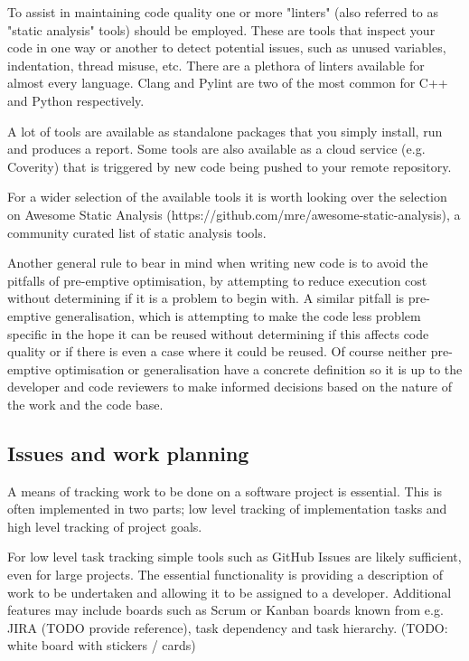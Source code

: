 \documentclass[jnr]{iosart2x}
\begin{document}
To assist in maintaining code quality one or more "linters" (also referred to as "static analysis" tools) should be employed.
These are tools that inspect your code in one way or another to detect potential issues, such as unused variables, indentation, thread misuse, etc.
There are a plethora of linters available for almost every language.
Clang \cite{Clang} and Pylint \cite{Pylint} are two of the most common for C++ and Python respectively.

A lot of tools are available as standalone packages that you simply install, run and produces a report.
Some tools are also available as a cloud service (e.g. Coverity) that is triggered by new code being pushed to your remote repository.

For a wider selection of the available tools it is worth looking over the selection on Awesome Static Analysis (https://github.com/mre/awesome-static-analysis), a community curated list of static analysis tools.

Another general rule to bear in mind when writing new code is to avoid the pitfalls of pre-emptive optimisation, by attempting to reduce execution cost without determining if it is a problem to begin with.
A similar pitfall is pre-emptive generalisation, which is attempting to make the code less problem specific in the hope it can be reused without determining if this affects code quality or if there is even a case where it could be reused.
Of course neither pre-emptive optimisation or generalisation have a concrete definition so it is up to the developer and code reviewers to make informed decisions based on the nature of the work and the code base.

\subsection{Issues and work planning}
\label{Issues and work planning}

A means of tracking work to be done on a software project is essential.
This is often implemented in two parts; low level tracking of implementation tasks and high level tracking of project goals.

For low level task tracking simple tools such as GitHub Issues are likely sufficient, even for large projects.
The essential functionality is providing a description of work to be undertaken and allowing it to be assigned to a developer.
Additional features may include boards such as Scrum or Kanban boards known from e.g.\/ JIRA (TODO provide reference), task dependency and task hierarchy. (TODO: white board with stickers / cards)
\end{document}
